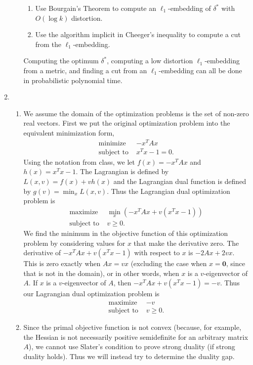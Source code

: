 \documentclass{article}
\newcommand{\0}{\mathbf{0}}
\begin{document}
\begin{enumerate}
\begin{enumerate}
\begin{enumerate}
    \item Use Bourgain's Theorem to compute an $\ell_1$-embedding of $\delta^*$ with $O(\log k)$ distortion.
    \item Use the algorithm implicit in Cheeger's inequality to compute a cut from the $\ell_1$-embedding.
    \end{enumerate}
    Computing the optimum $\delta^*$, computing a low distortion $\ell_1$-embedding from a metric, and finding a cut from an $\ell_1$-embedding can all be done in probabilistic polynomial time.
  \end{enumerate}
\item
  \begin{enumerate}
  \item
    We assume the domain of the optimization problems is the set of non-zero real vectors.
    First we put the original optimization problem into the equivalent minimization form,
    \begin{align*}
      \text{minimize } & -x^T A x \\
      \text{subject to } & x^T x - 1 = 0.
    \end{align*}
    Using the notation from class, we let $f(x) = -x^T A x$ and $h(x) = x^T x - 1$.
    The Lagrangian is defined by $L(x, v) = f(x) + v h(x)$ and the Lagrangian dual function is defined by $g(v) = \min_x L(x, v)$.
    Thus the Lagrangian dual optimization problem is
    \begin{align*}
      \text{maximize } & \min_{x} \left(-x^T A x + v \left(x^T x - 1\right)\right) \\
      \text{subject to } & v \geq 0.
    \end{align*}
    We find the minimum in the objective function of this optimization problem by considering values for $x$ that make the derivative zero.
    The derivative of $-x^T A x + v \left(x^T x - 1\right)$ with respect to $x$ is $-2 A x + 2 v x$.
    This is zero exactly when $Ax = vx$ (excluding the case when $x = \0$, since that is not in the domain), or in other words, when $x$ is a $v$-eigenvector of $A$.
    If $x$ is a $v$-eigenvector of $A$, then $-x^T A x + v \left(x^T x - 1\right) = -v$.
    Thus our Lagrangian dual optimization problem is
    \begin{align*}
      \text{maximize } & -v \\
      \text{subject to } & v \geq 0.
    \end{align*}
  \item
    Since the primal objective function is not convex (because, for example, the Hessian is not necessarily positive semidefinite for an arbitrary matrix $A$), we cannot use Slater's condition to prove strong duality (if strong duality holds).
    Thus we will instead try to determine the duality gap.


\end{enumerate}
\end{enumerate}
\end{document}
